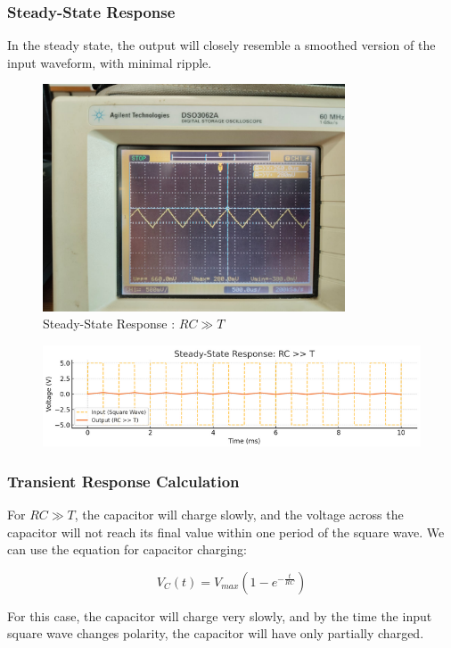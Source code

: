 \documentclass[a4paper,12pt]{article}
\begin{document}
\subsubsection*{Steady-State Response}
In the steady state, the output will closely resemble a smoothed version of the input waveform, with minimal ripple.
\begin{figure}[H]
   \centering
   \includegraphics[width=0.8\textwidth]{figs/rc>t.jpeg}
   \caption{Steady-State Response : \( RC \gg T \)}
\end{figure}

\begin{figure}[H]
    \centering
    \includegraphics[width=\textwidth]{figs/rc>t_prog.png}
\end{figure}

\subsubsection*{Transient Response Calculation}
For \( RC \gg T \), the capacitor will charge slowly, and the voltage across the capacitor will not reach its final value within one period of the square wave. We can use the equation for capacitor charging:

\[
V_C(t) = V_{max} \left( 1 - e^{-\frac{t}{RC}} \right)
\]

For this case, the capacitor will charge very slowly, and by the time the input square wave changes polarity, the capacitor will have only partially charged.\\
\end{document}
